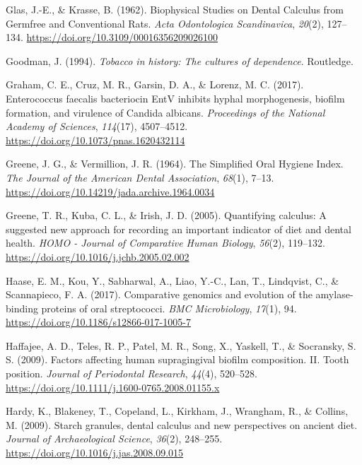 \documentclass[
  letterpaper,
]{book}
\newlength{\cslhangindent}
\newlength{\cslentryspacingunit} %
\newenvironment{CSLReferences}[2] %
 {%
  \setlength{\parindent}{0pt}
  \ifodd #1
  \let\oldpar\par
  \def\par{\hangindent=\cslhangindent\oldpar}
  \fi
  \setlength{\parskip}{#2\cslentryspacingunit}
 }%
 {}
\begin{document}
\begin{CSLReferences}{1}{0}
\leavevmode{}%
Glas, J.-E., \& Krasse, B. (1962). Biophysical {Studies} on {Dental
Calculus} from {Germfree} and {Conventional Rats}. \emph{Acta
Odontologica Scandinavica}, \emph{20}(2), 127--134.
\url{https://doi.org/10.3109/00016356209026100}

\leavevmode{}%
Goodman, J. (1994). \emph{Tobacco in history: The cultures of
dependence}. {Routledge}.

\leavevmode{}%
Graham, C. E., Cruz, M. R., Garsin, D. A., \& Lorenz, M. C. (2017).
Enterococcus faecalis bacteriocin {EntV} inhibits hyphal morphogenesis,
biofilm formation, and virulence of {Candida} albicans.
\emph{Proceedings of the National Academy of Sciences}, \emph{114}(17),
4507--4512. \url{https://doi.org/10.1073/pnas.1620432114}

\leavevmode{}%
Greene, J. G., \& Vermillion, J. R. (1964). The {Simplified Oral Hygiene
Index}. \emph{The Journal of the American Dental Association},
\emph{68}(1), 7--13.
\url{https://doi.org/10.14219/jada.archive.1964.0034}

\leavevmode{}%
Greene, T. R., Kuba, C. L., \& Irish, J. D. (2005). Quantifying
calculus: {A} suggested new approach for recording an important
indicator of diet and dental health. \emph{HOMO - Journal of Comparative
Human Biology}, \emph{56}(2), 119--132.
\url{https://doi.org/10.1016/j.jchb.2005.02.002}

\leavevmode{}%
Haase, E. M., Kou, Y., Sabharwal, A., Liao, Y.-C., Lan, T., Lindqvist,
C., \& Scannapieco, F. A. (2017). Comparative genomics and evolution of
the amylase-binding proteins of oral streptococci. \emph{BMC
Microbiology}, \emph{17}(1), 94.
\url{https://doi.org/10.1186/s12866-017-1005-7}

\leavevmode{}%
Haffajee, A. D., Teles, R. P., Patel, M. R., Song, X., Yaskell, T., \&
Socransky, S. S. (2009). Factors affecting human supragingival biofilm
composition. {II}. {Tooth} position. \emph{Journal of Periodontal
Research}, \emph{44}(4), 520--528.
\url{https://doi.org/10.1111/j.1600-0765.2008.01155.x}

\leavevmode{}%
Hardy, K., Blakeney, T., Copeland, L., Kirkham, J., Wrangham, R., \&
Collins, M. (2009). Starch granules, dental calculus and new
perspectives on ancient diet. \emph{Journal of Archaeological Science},
\emph{36}(2), 248--255. \url{https://doi.org/10.1016/j.jas.2008.09.015}


\end{CSLReferences}
\end{document}
